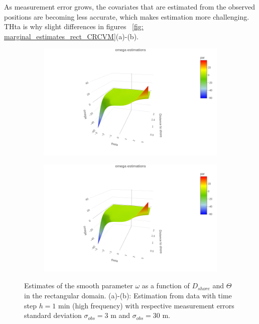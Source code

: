 \documentclass[11pt]{article}
\newcommand {\1}{\mathbb{1}}
\begin{document}
As measurement error grows, the covariates that are estimated from the observed positions are becoming less accurate, which makes estimation more challenging. THta is why slight differences in figures ~\ref{fig: marginal_estimates_rect_CRCVM}(a)-(b).

\begin{figure}[H]
	\centering
	\begin{subfigure}{0.48\textwidth}
		\centering
		\includegraphics[scale=0.3]{images/simulation study/omega_crcvm_rect_hf_ne1.png}
		\caption{}
	\end{subfigure}
	\begin{subfigure}{0.48\textwidth}
		\centering
		\includegraphics[scale=0.3]{images/simulation study/omega_crcvm_rect_hf_ne1.png}
		\caption{}
	\end{subfigure}
	\caption{Estimates of the smooth parameter $\omega$ as a function of $D_{shore}$ and $\Theta$ in the rectangular domain. (a)-(b): Estimation from data with time step $h=1$ min (high frequency) with respective measurement errors standard deviation $\sigma_{obs}=3$ m and $\sigma_{obs}=30$ m.}
	\label{fig: estimate_rect_CRCVM}
\end{figure}
\end{document}
